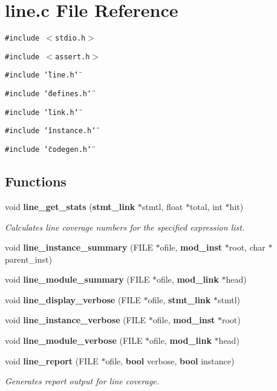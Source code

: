 \section{line.c File Reference}
\label{line_8c}
{\tt \#include $<$stdio.h$>$}\par
{\tt \#include $<$assert.h$>$}\par
{\tt \#include \char`\"{}line.h\char`\"{}}\par
{\tt \#include \char`\"{}defines.h\char`\"{}}\par
{\tt \#include \char`\"{}link.h\char`\"{}}\par
{\tt \#include \char`\"{}instance.h\char`\"{}}\par
{\tt \#include \char`\"{}codegen.h\char`\"{}}\par
\subsection*{Functions}
\begin{CompactItemize}
\item 
void {\bf line\_\-get\_\-stats} ({\bf stmt\_\-link} $\ast$stmtl, float $\ast$total, int $\ast$hit)
\begin{CompactList}\small\item\em Calculates line coverage numbers for the specified expression list.\item\end{CompactList}\item 
void {\bf line\_\-instance\_\-summary} (FILE $\ast$ofile, {\bf mod\_\-inst} $\ast$root, char $\ast$parent\_\-inst)
\item 
void {\bf line\_\-module\_\-summary} (FILE $\ast$ofile, {\bf mod\_\-link} $\ast$head)
\item 
void {\bf line\_\-display\_\-verbose} (FILE $\ast$ofile, {\bf stmt\_\-link} $\ast$stmtl)
\item 
void {\bf line\_\-instance\_\-verbose} (FILE $\ast$ofile, {\bf mod\_\-inst} $\ast$root)
\item 
void {\bf line\_\-module\_\-verbose} (FILE $\ast$ofile, {\bf mod\_\-link} $\ast$head)
\item 
void {\bf line\_\-report} (FILE $\ast$ofile, {\bf bool} verbose, {\bf bool} instance)
\begin{CompactList}\small\item\em Generates report output for line coverage.\item\end{CompactList}\end{CompactItemize}
